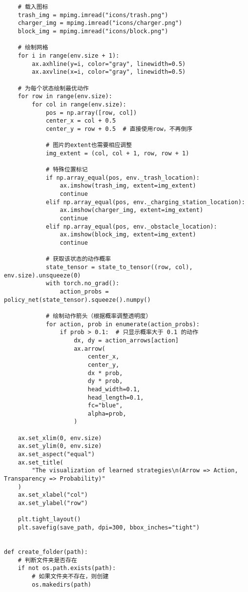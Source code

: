 \begin{verbatim}
    # 载入图标
    trash_img = mpimg.imread("icons/trash.png")
    charger_img = mpimg.imread("icons/charger.png")
    block_img = mpimg.imread("icons/block.png")

    # 绘制网格
    for i in range(env.size + 1):
        ax.axhline(y=i, color="gray", linewidth=0.5)
        ax.axvline(x=i, color="gray", linewidth=0.5)

    # 为每个状态绘制最优动作
    for row in range(env.size):
        for col in range(env.size):
            pos = np.array([row, col])
            center_x = col + 0.5
            center_y = row + 0.5  # 直接使用row，不再倒序

            # 图片的extent也需要相应调整
            img_extent = (col, col + 1, row, row + 1)

            # 特殊位置标记
            if np.array_equal(pos, env._trash_location):
                ax.imshow(trash_img, extent=img_extent)
                continue
            elif np.array_equal(pos, env._charging_station_location):
                ax.imshow(charger_img, extent=img_extent)
                continue
            elif np.array_equal(pos, env._obstacle_location):
                ax.imshow(block_img, extent=img_extent)
                continue

            # 获取该状态的动作概率
            state_tensor = state_to_tensor((row, col), env.size).unsqueeze(0)
            with torch.no_grad():
                action_probs = policy_net(state_tensor).squeeze().numpy()

            # 绘制动作箭头（根据概率调整透明度）
            for action, prob in enumerate(action_probs):
                if prob > 0.1:  # 只显示概率大于 0.1 的动作
                    dx, dy = action_arrows[action]
                    ax.arrow(
                        center_x,
                        center_y,
                        dx * prob,
                        dy * prob,
                        head_width=0.1,
                        head_length=0.1,
                        fc="blue",
                        alpha=prob,
                    )

    ax.set_xlim(0, env.size)
    ax.set_ylim(0, env.size)
    ax.set_aspect("equal")
    ax.set_title(
        "The visualization of learned strategies\n(Arrow => Action, Transparency => Probability)"
    )
    ax.set_xlabel("col")
    ax.set_ylabel("row")

    plt.tight_layout()
    plt.savefig(save_path, dpi=300, bbox_inches="tight")


def create_folder(path):
    # 判断文件夹是否存在
    if not os.path.exists(path):
        # 如果文件夹不存在，则创建
        os.makedirs(path)



\end{verbatim}
